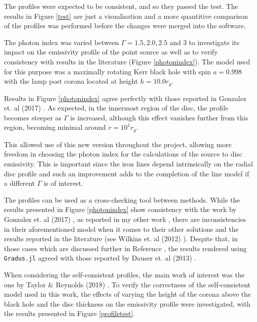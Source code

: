 \documentclass[fleqn,usenatbib,useAMS]{mnras}
\begin{document}
The profiles were expected to be consistent, and so they passed the test. The results in Figure \ref{test} are just a visualisation and a more quantitive comparison of the profiles was performed before the changes were merged into the software.

The photon index was varied between $\Gamma = 1.5, 2.0, 2.5$ and $3$ to investigate its impact on the emissivity profile of the point source as well as to verify consistency with results in the literature (Figure \ref{photonindex}). The model used for this purpose was a maximally rotating Kerr black hole with spin $a = 0.998$ with the lamp post corona located at height $h = 10.0 r_{g}$. 

Results in Figure \ref{photonindex} agree perfectly with those reported in Gonzalez et. al (2017) \cite{gonzalez2017probing}. As expected, in the innermost region of the disc, the profile becomes steeper as $\Gamma$ is increased, although this effect vanishes further from this region, becoming minimal around $r = 10^{1} r_{g}$. 

This allowed use of this new version throughout the project, allowing more freedom in choosing the photon index for the calculations of the source to disc emissivity. This is important since the iron lines depend intrinsically on the radial disc profile and such an improvement adds to the completion of the line model if a different $\Gamma$ is of interest. 

The profiles can be used as a cross-checking tool between methods. While the results presented in Figure \ref{photonindex} show consistency with the work by Gonzalez et. al (2017) \cite{gonzalez2017probing}, as reported in my other work \cite{tarnopolska2024properties}, there are inconsistencies in their aforementioned model when it comes to their other solutions and the results reported in the literature (see Wilkins et. al (2012) \cite{wilkins2012understanding}). Despite that, in those cases which are discussed further in Reference \cite{tarnopolska2024properties}, the results rendered using {\tt Gradus.jl} agreed with those reported by Dauser et. al (2013) \cite{dauser2013irradiation}.

When considering the self-consistent profiles, the main work of interest was the one by Taylor \& Reynolds (2018) \cite{taylor2018exploring}. To verify the correctness of the self-consistent model used in this work, the effects of varying the height of the corona above the black hole and the disc thickness on the emissivity profile were investigated, with the results presented in Figure \ref{profiletest}.
\end{document}
